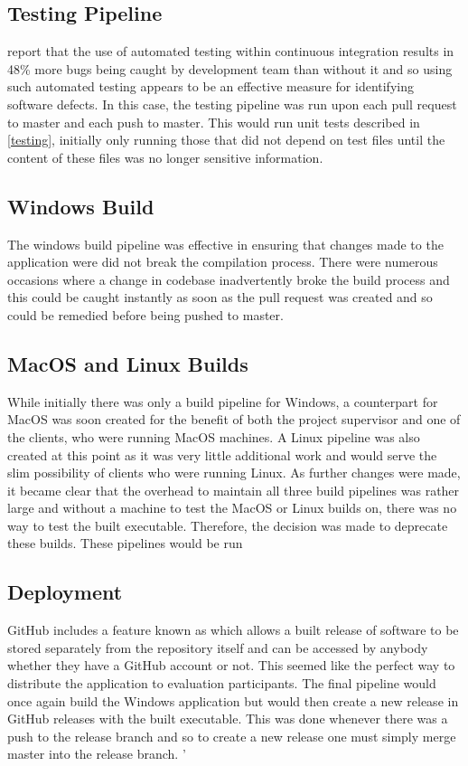 \documentclass{l4proj}
\begin{document}
\subsection{Testing Pipeline}
\cite{vasilescu} report that the use of automated testing within continuous integration results in 48\% more bugs being caught by development team than without it and so using such automated testing appears to be an effective measure for identifying software defects. In this case, the testing pipeline was run upon each pull request to master and each push to master. This would run unit tests described in \ref{testing}, initially only running those that did not depend on test files until the content of  these files was no longer sensitive information.
 
 \subsection{Windows Build}
 The windows build pipeline was effective in ensuring that changes made to the application were did not break the compilation process. There were numerous occasions where a change in codebase inadvertently broke the build process and this could be caught instantly as soon as the pull request was created and so could be remedied before being pushed to master.
 
 \subsection{MacOS and Linux Builds}
 While initially there was only a build pipeline for Windows, a counterpart for MacOS was soon created for the benefit of both the project supervisor and one of the clients, who were running MacOS machines.  A Linux pipeline was also created at this point as it was very little additional work and would serve the slim possibility of clients who were running Linux. As further changes were made, it became clear that the overhead to maintain all three build pipelines was rather large and without a machine to test the MacOS or Linux builds on, there was no way to test the built executable. Therefore, the decision was made to deprecate these builds. These pipelines would be run 
 
\subsection{Deployment}
GitHub includes a feature known as  which allows a built release of software to be stored separately from the repository itself and can be accessed by anybody whether they have a GitHub account or not. This seemed like the perfect way to distribute the application to evaluation participants. The final pipeline would once again build the Windows application but would then create a new release in GitHub releases with the built executable. This was done whenever there was a push to the release branch and so to create a new release one must simply merge master into the release branch.
'
\end{document}
